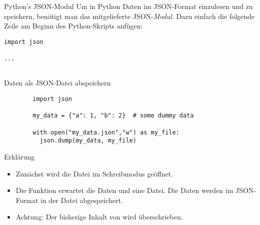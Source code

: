 \begin{fragile}
	
\begin{block}{Python's JSON-Modul}
\vspace{2pt}
Um in Python Daten im JSON-Format einzulesen und zu speichern, benötigt man das mitgelieferte JSON-\emph{Modul}. 
Dazu einfach die folgende Zeile am Beginn des Python-Skripts anfügen: 

\pause 

\begin{verbatim}
import json 

...


\end{verbatim}
\end{block}	

\end{fragile}


\begin{fragile}
	\begin{block}{Daten als JSON-Datei abspeichern}
		\vspace{2pt}
		
		\begin{verbatim}
		import json 
		
		my_data = {"a": 1, "b": 2}  # some dummy data
		
		with open("my_data.json","w") as my_file:
		  json.dump(my_data, my_file)
		\end{verbatim}
		
		\pause
		
		\vspace{12pt}
		
		\begin{exampleblock}{Erklärung}
			\vspace{2pt}
			\begin{itemize}[<+->]
				\item Zunächst wird die Datei  im Schreibmodus geöffnet.  
				\item Die Funktion  erwartet die Daten und eine Datei. Die Daten werden im JSON-Format in der Datei abgespeichert. 
				\item Achtung: Der bisherige Inhalt von  wird überschrieben.  
			\end{itemize}
		\end{exampleblock}
	\end{block}
\end{fragile}


